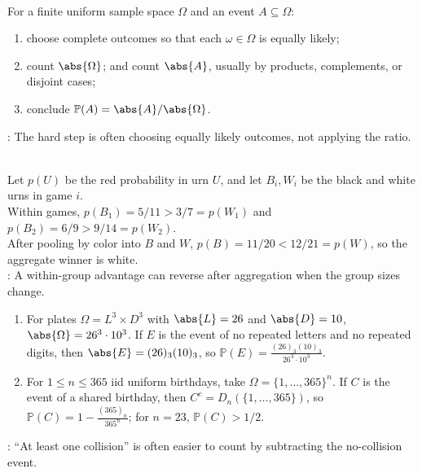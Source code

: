 \begin{method} \label{meth:finite-uniform-probability-counting-workflow} \\
For a finite uniform sample space $\Omega$ and an event $A\subseteq\Omega$:
\begin{enumerate}[label=(\roman*)]
\setlength{\itemsep}{0pt}
\item choose complete outcomes so that each $\omega\in\Omega$ is equally likely;
\item count $\abs{\Omega}$; and count $\abs{A}$, usually by products, complements, or disjoint cases;
\item conclude $\mathbb{P}(A)=\abs{A}/\abs{\Omega}$.
\end{enumerate}
: The hard step is often choosing equally likely outcomes, not applying the ratio.
\end{method}

\begin{example} \label{ex:simpsons-paradox-urn-counting} \\
Let $p(U)$ be the red probability in urn $U$, and let $B_i,W_i$ be the black and white urns in game $i$.\\
Within games, $p(B_1)=5/11>3/7=p(W_1)$ and $p(B_2)=6/9>9/14=p(W_2)$.\\
After pooling by color into $B$ and $W$, $p(B)=11/20<12/21=p(W)$, so the aggregate winner is white.\\
: A within-group advantage can reverse after aggregation when the group sizes change.
\end{example}

\begin{example} \label{ex:license-plates-and-birthday-complement} 
\begin{enumerate}[label=(\roman*)]
\setlength{\itemsep}{0pt}
\item For plates $\Omega=L^3\times D^3$ with $\abs{L}=26$ and $\abs{D}=10$, $\abs{\Omega}=26^3\cdot10^3$. If $E$ is the event of no repeated letters and no repeated digits, then $\abs{E}=(26)_3(10)_3$, so $\mathbb{P}(E)=\frac{(26)_3(10)_3}{26^3\cdot10^3}$.
\item For $1\leq n\leq365$ iid uniform birthdays, take $\Omega=\{1,\ldots,365\}^n$. If $C$ is the event of a shared birthday, then $C^c=D_n(\{1,\ldots,365\})$, so $\mathbb{P}(C)=1-\frac{(365)_n}{365^n}$; for $n=23$, $\mathbb{P}(C)>1/2$.
\end{enumerate}
: ``At least one collision'' is often easier to count by subtracting the no-collision event.
\end{example}

